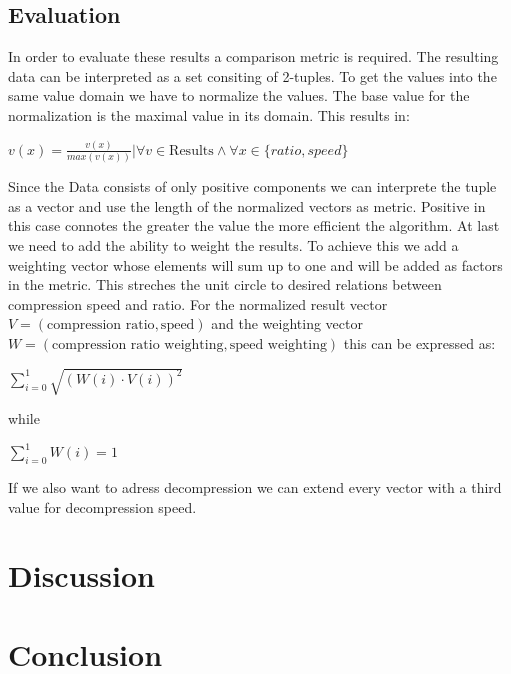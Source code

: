 \documentclass[
	12pt,
	a4paper,
	BCOR10mm,
	DIV14,
	listof=totoc,
	bibliography=totoc,
	headsepline
]{scrreprt}
\begin{document}
\section{Evaluation}
In order to evaluate these results a comparison metric is required.
The resulting data can be interpreted as a set consiting of 2-tuples.
To get the values into the same value domain we have to normalize the values.
The base value for the normalization is the maximal value in its domain.
This results in:
\begin{center}
	\(
	   v(x) = \frac{v(x)}{max(v(x))}|\forall v \in \text{Results} \land \forall x \in \{ratio, speed\}
	\)
\end{center}

Since the Data consists of only positive components we can interprete the tuple as a vector and use the length of the normalized vectors as metric. 
Positive in this case connotes the greater the value the more efficient the algorithm.
At last we need to add the ability to weight the results. 
To achieve this we add a weighting vector whose elements will sum up to one and will be added as factors in the metric. 
This streches the unit circle to desired relations between compression speed and ratio.
For the normalized result vector \(V = (\text{compression ratio}, \text{speed})\) and the weighting vector \(W = (\text{compression ratio weighting}, \text{speed weighting})\) this can be expressed as:
\begin{center}
	\(
	\sum\limits^{1}_{i=0} \sqrt{(W(i) \cdot V(i))^2}
	\)
\end{center}
while
\begin{center}
	\(
	\sum\limits^{1}_{i=0}W(i) = 1
	\)
\end{center}
If we also want to adress decompression we can extend every vector with a third value for decompression speed.

	
\chapter{Discussion}
\label{Discussion}


\chapter{Conclusion}
\label{Conclusion}

\nocite{*}



\listoffigures
\end{document}
